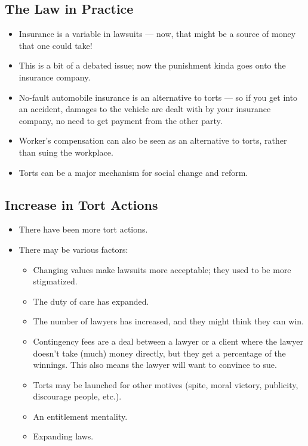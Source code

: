 \documentclass{article}
\begin{document}
\subsection{The Law in Practice}
\begin{itemize}
    \item Insurance is a variable in lawsuits --- now, that might be a source of money that one could take!
    \item This is a bit of a debated issue; now the punishment kinda goes onto the insurance company.
    \item No-fault automobile insurance is an alternative to torts --- so if you get into an accident, damages to the vehicle are dealt with by your insurance company, no need to get payment from the other party.
    \item Worker's compensation can also be seen as an alternative to torts, rather than suing the workplace.
    \item Torts can be a major mechanism for social change and reform.
\end{itemize}

\subsection{Increase in Tort Actions}
\begin{itemize}
    \item There have been more tort actions.
    \item There may be various factors:
        \begin{itemize}
            \item Changing values make lawsuits more acceptable; they used to be more stigmatized.
            \item The duty of care has expanded.
            \item The number of lawyers has increased, and they might think they can win.
            \item Contingency fees are a deal between a lawyer or a client where the lawyer doesn't take (much) money directly, but they get a percentage of the winnings.  This also means the lawyer will want to convince to sue.
            \item Torts may be launched for other motives (spite, moral victory, publicity, discourage people, etc.).
            \item An entitlement mentality.
            \item Expanding laws.
        \end{itemize}
\end{itemize}
\end{document}
